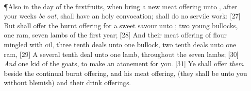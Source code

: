 \\
\P \textcolor[cmyk]{0.99998,1,0,0}{Also in the day of the firstfruits, when  bring a new meat offering unto  , after your weeks \emph{be} \emph{out},  shall have an holy convocation;  shall do no servile work:}
[27] \textcolor[cmyk]{0.99998,1,0,0}{But  shall offer the burnt offering for a sweet savour unto ; two young bullocks, one ram, seven lambs of the first year;}
[28] \textcolor[cmyk]{0.99998,1,0,0}{And their meat offering of flour mingled with oil, three tenth deals unto one bullock, two tenth deals unto one ram,}
[29] \textcolor[cmyk]{0.99998,1,0,0}{A several tenth deal unto one lamb, throughout the seven lambs;}
[30] \textcolor[cmyk]{0.99998,1,0,0}{\emph{And} one kid of the goats, to make an atonement for you.}
[31] \textcolor[cmyk]{0.99998,1,0,0}{Ye shall offer \emph{them} beside the continual burnt offering, and his meat offering, (they shall be unto you without blemish) and their drink offerings.}